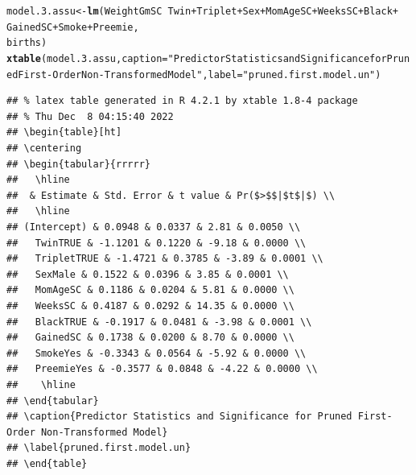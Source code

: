 \documentclass{article}\usepackage[]{graphicx}\usepackage[]{xcolor}
\makeatletter
\newcommand{\hlstr}[1]{\textcolor[rgb]{0.192,0.494,0.8}{#1}}%
\newcommand{\hlopt}[1]{\textcolor[rgb]{0,0,0}{#1}}%
\newcommand{\hlstd}[1]{\textcolor[rgb]{0.345,0.345,0.345}{#1}}%
\newcommand{\hlkwb}[1]{\textcolor[rgb]{0.69,0.353,0.396}{#1}}%
\newcommand{\hlkwc}[1]{\textcolor[rgb]{0.333,0.667,0.333}{#1}}%
\newcommand{\hlkwd}[1]{\textcolor[rgb]{0.737,0.353,0.396}{\textbf{#1}}}%
\newenvironment{kframe}{%
 \def\at@end@of@kframe{}%
 \ifinner\ifhmode%
  \def\at@end@of@kframe{\end{minipage}}%
  \begin{minipage}{\columnwidth}%
 \fi\fi%
 \def\FrameCommand##1{\hskip\@totalleftmargin \hskip-\fboxsep
 \colorbox{shadecolor}{##1}\hskip-\fboxsep
     \hskip-\linewidth \hskip-\@totalleftmargin \hskip\columnwidth}%
 \MakeFramed {\advance\hsize-\width
   \@totalleftmargin\z@ \linewidth\hsize
   \@setminipage}}%
 {\par\unskip\endMakeFramed%
 \at@end@of@kframe}
\newenvironment{knitrout}{}{} %
\makeatother
\begin{document}
\begin{knitrout}
\color{fgcolor}\begin{kframe}
\begin{alltt}
\hlstd{model.3.assu} \hlkwb{<-} \hlkwd{lm}\hlstd{(WeightGmSC} \hlopt{~} \hlstd{Twin} \hlopt{+} \hlstd{Triplet} \hlopt{+} \hlstd{Sex} \hlopt{+} \hlstd{MomAgeSC} \hlopt{+} \hlstd{WeeksSC} \hlopt{+} \hlstd{Black} \hlopt{+}
                      \hlstd{GainedSC} \hlopt{+} \hlstd{Smoke} \hlopt{+} \hlstd{Preemie,}
                    \hlstd{births)}
\hlkwd{xtable}\hlstd{(model.3.assu,} \hlkwc{caption}\hlstd{=}\hlstr{"Predictor Statistics and Significance for Pruned First-Order Non-Transformed Model"}\hlstd{,} \hlkwc{label}\hlstd{=}\hlstr{"pruned.first.model.un"}\hlstd{)}
\end{alltt}
\begin{verbatim}
## % latex table generated in R 4.2.1 by xtable 1.8-4 package
## % Thu Dec  8 04:15:40 2022
## \begin{table}[ht]
## \centering
## \begin{tabular}{rrrrr}
##   \hline
##  & Estimate & Std. Error & t value & Pr($>$$|$t$|$) \\ 
##   \hline
## (Intercept) & 0.0948 & 0.0337 & 2.81 & 0.0050 \\ 
##   TwinTRUE & -1.1201 & 0.1220 & -9.18 & 0.0000 \\ 
##   TripletTRUE & -1.4721 & 0.3785 & -3.89 & 0.0001 \\ 
##   SexMale & 0.1522 & 0.0396 & 3.85 & 0.0001 \\ 
##   MomAgeSC & 0.1186 & 0.0204 & 5.81 & 0.0000 \\ 
##   WeeksSC & 0.4187 & 0.0292 & 14.35 & 0.0000 \\ 
##   BlackTRUE & -0.1917 & 0.0481 & -3.98 & 0.0001 \\ 
##   GainedSC & 0.1738 & 0.0200 & 8.70 & 0.0000 \\ 
##   SmokeYes & -0.3343 & 0.0564 & -5.92 & 0.0000 \\ 
##   PreemieYes & -0.3577 & 0.0848 & -4.22 & 0.0000 \\ 
##    \hline
## \end{tabular}
## \caption{Predictor Statistics and Significance for Pruned First-Order Non-Transformed Model} 
## \label{pruned.first.model.un}
## \end{table}
\end{verbatim}
\end{kframe}
\end{knitrout}
\end{document}
